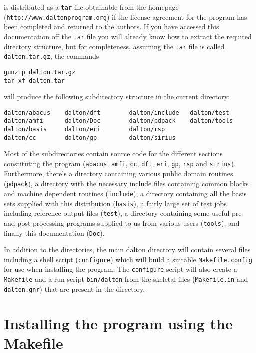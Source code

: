 {\dalton} is distributed as a \verb|tar| file obtainable from
the {\dalton} homepage\\
(\verb|http://www.daltonprogram.org|) if the
license agreement for the program has been completed and returned to
the authors.  If you have accessed this documentation off the
\verb|tar| file you will
already know how to extract the required directory structure, but
for completeness, assuming the \verb|tar| file is called
\verb|dalton.tar.gz|, the commands
\begin{verbatim}
gunzip dalton.tar.gz
tar xf dalton.tar
\end{verbatim}
will produce the following subdirectory structure in the current
directory:
\begin{verbatim}
dalton/abacus    dalton/dft        dalton/include   dalton/test
dalton/amfi      dalton/Doc        dalton/pdpack    dalton/tools
dalton/basis     dalton/eri        dalton/rsp
dalton/cc        dalton/gp         dalton/sirius
\end{verbatim}
Most of the subdirectories contain source code for the different sections
constituting the program (\verb|abacus|, \verb|amfi|, \verb|cc|, \verb|dft|,
\verb|eri|, \verb|gp|, \verb|rsp| and \verb|sirius|). Furthermore,
there's a directory containing
various public domain routines (\verb|pdpack|), a directory with the
necessary include files containing common blocks and
machine dependent routines (\verb|include|), a directory containing
all the basis sets supplied with this distribution (\verb|basis|), a
fairly large set of test jobs including reference output files
(\verb|test|), a directory containing some useful pre- and
post-processing programs supplied to us from various users
(\verb|tools|), and finally this documentation (\verb|Doc|). 

In addition to the directories, the main dalton directory will
contain several files including a shell script (\verb|configure|)
which will build a suitable \verb|Makefile.config| for use when
installing the program. The \verb|configure| script will also create a
\verb|Makefile| and a run script \verb|bin/dalton| from the skeletal files
(\verb|Makefile.in| and \verb|dalton.gnr|) that are present in the
directory.


\section{Installing the program using the
Makefile}\label{sec:Makefile}

